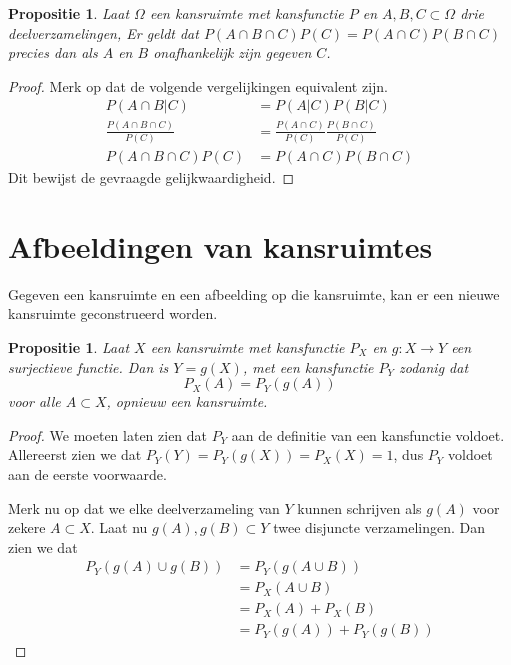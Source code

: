 \documentclass[a4paper]{report}
\newtheorem{proposition}[theorem]{Propositie}
\theoremstyle{definition}
\begin{document}
\begin{proposition}
    Laat $\Omega$ een kansruimte met kansfunctie $P$ en $A,B,C \subset \Omega$ drie deelverzamelingen,
    Er geldt dat $P(A \cap B \cap C)P(C) = P(A \cap C)P(B \cap C)$ precies dan als $A$ en $B$ onafhankelijk zijn gegeven $C$.
\end{proposition}
\begin{proof}
    Merk op dat de volgende vergelijkingen equivalent zijn.
    \begin{align*}
        P(A \cap B|C)                       &= P(A|C)P(B|C) \\
        \frac{P(A \cap B \cap C)}{P(C)}     &= \frac{P(A \cap C)}{P(C)} \frac{P(B \cap C)}{P(C)} \\
        P(A \cap B \cap C)P(C)              &= P(A \cap C)P(B \cap C)
    \end{align*}
    Dit bewijst de gevraagde gelijkwaardigheid.
\end{proof}


\section{Afbeeldingen van kansruimtes}
Gegeven een kansruimte en een afbeelding op die kansruimte, kan er een nieuwe kansruimte geconstrueerd worden.

\begin{proposition}
    Laat $X$ een kansruimte met kansfunctie $P_X$ en $g: X \to Y$ een surjectieve functie.
    Dan is $Y = g(X)$, met een kansfunctie $P_Y$ zodanig dat
    \[ P_X(A) = P_Y(g(A)) \]
    voor alle $A \subset X$, opnieuw een kansruimte.
\end{proposition}
\begin{proof}
    We moeten laten zien dat $P_Y$ aan de definitie van een kansfunctie voldoet.
    Allereerst zien we dat $P_Y(Y) = P_Y(g(X)) = P_X(X) = 1$, dus $P_Y$ voldoet aan de eerste voorwaarde.

    Merk nu op dat we elke deelverzameling van $Y$ kunnen schrijven als $g(A)$ voor zekere $A \subset X$.
    Laat nu $g(A),g(B) \subset Y$ twee disjuncte verzamelingen.
    Dan zien we dat
    \begin{align*}
        P_Y(g(A) \cup g(B)) &= P_Y(g(A \cup B)) \\
                            &= P_X(A \cup B) \\
                            &= P_X(A) + P_X(B) \\
                            &= P_Y(g(A)) + P_Y(g(B))
    \end{align*}

\end{proof}
\end{document}
